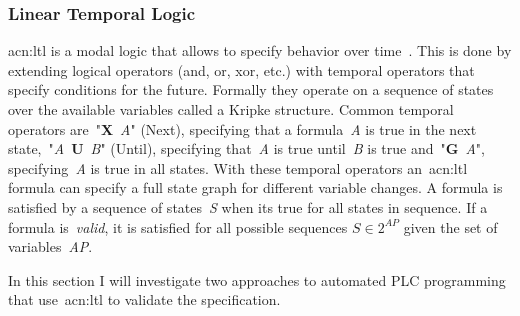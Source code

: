 \subsubsection{Linear Temporal Logic}
\label{sec:sub:ltl}

\acrfull{acn:ltl} is a modal logic that allows to specify behavior over time~\cite{4567924}.
This is done by extending logical operators (and, or, xor, etc.) with temporal operators that specify conditions for the future.
Formally they operate on a sequence of states over the available variables called a Kripke structure.
Common temporal operators are~"\textbf{X}~\textit{A}" (Next), specifying that a formula~\textit{A} is true in the next state,~"\textit{A}~\textbf{U}~\textit{B}" (Until), specifying that~\textit{A} is true until~\textit{B} is true and~"\textbf{G}~\textit{A}", specifying~\textit{A} is true in all states.
With these temporal operators an~\acrshort{acn:ltl} formula can specify a full state graph for different variable changes.
A formula is satisfied by a sequence of states~\textit{S} when its true for all states in sequence.
If a formula is~\textit{valid}, it is satisfied for all possible sequences $ S\in 2^{AP} $ given the set of variables~\textit{AP}.

In this section I will investigate two approaches to automated PLC programming that use~\acrshort{acn:ltl} to validate the specification.

